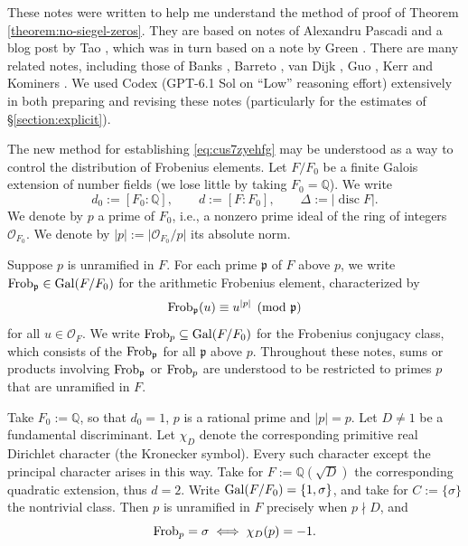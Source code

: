 \documentclass[reqno]{amsart} 
\begin{document}
These notes were written to help me understand the method of proof of Theorem \ref{theorem:no-siegel-zeros}.  They are based on notes of Alexandru Pascadi \cite{Pascadi2026PrivateCommunication} and a blog post by Tao \cite{Tao2026SiegelZeros}, which was in turn based on a note by Green \cite{hexagon:2610.00311v2}.  There are many related notes, including those of Banks \cite{2026arXiv2610.15483,2026arXiv2610.31402}, Barreto \cite{Barreto2026SiegelZeros}, van Dijk \cite{hexagon:2610.00409v1}, Guo \cite{2026arXiv2610.30476}, Kerr \cite{2026arXiv2610.21099v1} and Kominers \cite{Kominers2026FrobeniusPrimeSums}.  We used Codex (GPT-6.1 Sol on ``Low'' reasoning effort) extensively in both preparing and revising these notes (particularly for the estimates of \S\ref{section:explicit}).

The new method for establishing \eqref{eq:cus7zyehfg} may be understood as a way to control the distribution of Frobenius elements.  Let $F/F_0$ be a finite Galois extension of number fields (we lose little by taking $F_0 = \mathbb{Q}$).  We write
\begin{equation}\label{eq:cus6m6efl3}
  d_0:=[F_0:\mathbb Q],\qquad d:=[F:F_0],\qquad
  \Delta:=\lvert\operatorname{disc}F\rvert.
\end{equation}
We denote by $p$ a prime of $F_0$, i.e., a nonzero prime ideal of the ring of integers $\mathcal O_{F_0}$.  We denote by $|p|:=\lvert \mathcal O_{F_0}/p \rvert$ its absolute norm.

Suppose $p$ is unramified in $F$.  For each prime $\mathfrak p$ of $F$ above $p$, we write $\operatorname{Frob}_{\mathfrak p} \in \operatorname{Gal}(F / F_0)$ for the arithmetic Frobenius element, characterized by
\begin{equation}\label{eq:cus58nqx6q}
  \operatorname{Frob}_{\mathfrak p}(u) \equiv u^{|p|}\pmod{\mathfrak p}
\end{equation}
for all $u\in\mathcal O_F$.  We write $\operatorname{Frob}_p \subseteq \operatorname{Gal}(F / F_0)$ for the Frobenius conjugacy class, which consists of the $\operatorname{Frob}_{\mathfrak p}$ for all $\mathfrak p$ above $p$.  Throughout these notes, sums or products involving $\operatorname{Frob}_{\mathfrak{p}}$ or $\operatorname{Frob}_{p}$ are understood to be restricted to primes $p$ that are unramified in $F$.

\begin{example}\label{example:cus70rplg4}
  Take $F_0 := \mathbb{Q}$, so that $d_0 = 1$, $p$ is a rational prime and $|p| = p$.  Let $D\neq1$ be a fundamental discriminant.  Let $\chi_D$ denote the corresponding primitive real Dirichlet character (the Kronecker symbol).  Every such character except the principal character arises in this way.  Take for $F := \mathbb{Q}(\sqrt{D})$ the corresponding quadratic extension, thus $d = 2$.  Write $\operatorname{Gal}(F / F_0) = \{1, \sigma\}$, and take for $C := \{\sigma\}$ the nontrivial class.  Then $p$ is unramified in $F$ precisely when $p \nmid D$, and
  \begin{equation}
    \operatorname{Frob}_p = \sigma  \iff \chi_D(p) = -1.
  \end{equation}
\end{example}
\end{document}
